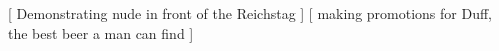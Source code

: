 \documentclass[x11names,parskip=half,ngerman]{bewerbung}
\begin{document}
%
%
%
%

\begin{cv}
	[ Demonstrating nude in
	front of the Reichstag ]
	[ making promotions for Duff, the best beer a man can find ]
\end{cv}
\end{document}
